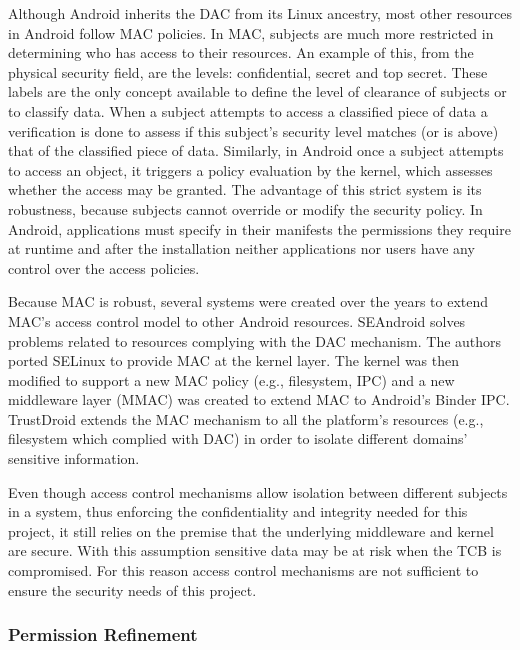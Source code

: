 Although Android inherits the \ac{DAC} from its Linux ancestry, most other resources in Android follow \ac{MAC} policies. In \ac{MAC}, subjects are much more restricted in determining who has access to their resources. An example of this, from the physical security field, are the levels: confidential, secret and top secret. These labels are the only concept available to define the level of clearance of subjects or to classify data. When a subject attempts to access a classified piece of data a verification is done to assess if this subject's security level matches (or is above) that of the classified piece of data. Similarly, in Android once a subject attempts to access an object, it triggers a policy evaluation by the kernel, which assesses whether the access may be granted. The advantage of this strict system is its robustness, because subjects cannot override or modify the security policy. In Android, applications must specify in their manifests the permissions they require at runtime and after the installation neither applications nor users have any control over the access policies.

Because \ac{MAC} is robust, several systems were created over the years to extend \ac{MAC}'s access control model to other Android resources. SEAndroid \cite{smalley2013security} solves problems related to resources complying with the \ac{DAC} mechanism. The authors ported SELinux \cite{peter2001integrating} to provide \ac{MAC} at the kernel layer. The kernel was then modified to support a new \ac{MAC} policy (e.g., filesystem, IPC) and a new middleware layer (MMAC) was created to extend \ac{MAC} to Android's Binder IPC. TrustDroid \cite{bugiel2011practical} extends the \ac{MAC} mechanism to all the platform's resources (e.g., filesystem which complied with DAC) in order to isolate different domains' sensitive information.

Even though access control mechanisms allow isolation between different subjects in a system, thus enforcing the confidentiality and integrity needed for this project, it still relies on the premise that the underlying middleware and kernel are secure. With this assumption sensitive data may be at risk when the \ac{TCB} is compromised. For this reason access control mechanisms are not sufficient to ensure the security needs of this project.  

\subsubsection{Permission Refinement}

